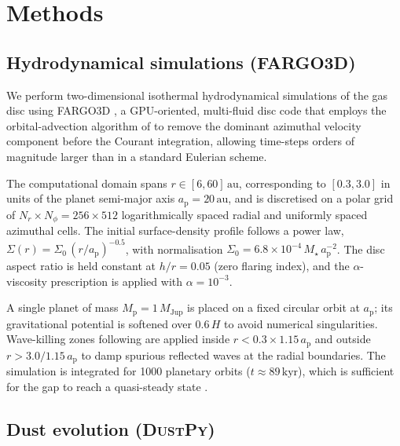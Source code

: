 
\section{Methods}
\label{sec:methods}

\subsection{Hydrodynamical simulations (\textsc{FARGO3D})}
\label{sec:fargo}

We perform two-dimensional isothermal hydrodynamical simulations of the
gas disc using \textsc{FARGO3D} \citep{BenitezLlambay2016}, a
GPU-oriented, multi-fluid disc code that employs the orbital-advection
algorithm of \citet{Masset2000} to remove the dominant azimuthal velocity
component before the Courant integration, allowing time-steps orders of
magnitude larger than in a standard Eulerian scheme.

The computational domain spans $r \in [6, 60]\,\mathrm{au}$, corresponding
to $[0.3, 3.0]$ in units of the planet semi-major axis
$a_\mathrm{p} = 20\,\mathrm{au}$, and is discretised on a polar grid of
$N_r \times N_\phi = 256 \times 512$ logarithmically spaced radial and
uniformly spaced azimuthal cells.
The initial surface-density profile follows a power law,
$\Sigma(r) = \Sigma_0\,(r/a_\mathrm{p})^{-0.5}$, with normalisation
$\Sigma_0 = 6.8\times10^{-4}\,M_\star\,a_\mathrm{p}^{-2}$.
The disc aspect ratio is held constant at $h/r = 0.05$ (zero flaring index),
and the \citet{ShakuraSunyaev1973} $\alpha$-viscosity prescription is
applied with $\alpha = 10^{-3}$.

A single planet of mass $M_\mathrm{p} = 1\,M_\mathrm{Jup}$ is placed on a
fixed circular orbit at $a_\mathrm{p}$; its gravitational potential is
softened over $0.6\,H$ to avoid numerical singularities.
Wave-killing zones following \citet{deValBorro2006} are applied inside
$r < 0.3\times1.15\,a_\mathrm{p}$ and outside
$r > 3.0/1.15\,a_\mathrm{p}$ to damp spurious reflected waves at the
radial boundaries.
The simulation is integrated for 1000 planetary orbits
($t \approx 89\,\mathrm{kyr}$), which is sufficient for the gap to reach a
quasi-steady state \citep{Kanagawa2016}.

\subsection{Dust evolution (\textsc{DustPy})}
\label{sec:dustpy}

